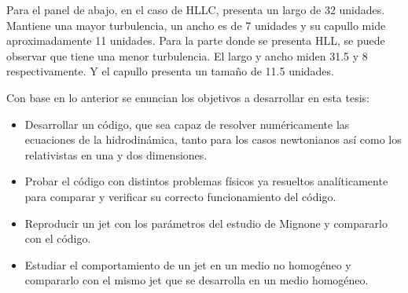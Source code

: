 \documentclass[12pt,a4paper]{book}
\begin{document}
{\color{blue} Para el panel de abajo, en el caso de HLLC, presenta un largo de 32 unidades. Mantiene una mayor turbulencia, un ancho es de 7 unidades y su capullo mide aproximadamente 11 unidades. Para la parte donde se presenta HLL, se puede observar que tiene una menor turbulencia. El largo y ancho miden 31.5 y 8 respectivamente. Y el capullo presenta un tamaño de 11.5 unidades. }

{\color{blue} Con base en lo anterior se enuncian los objetivos a desarrollar en esta tesis:
\begin{itemize}
  \item Desarrollar un código, que sea capaz de resolver numéricamente las ecuaciones de la hidrodinámica, tanto para los casos newtonianos así como los relativistas en una y dos dimensiones.
  \item Probar el código con distintos problemas físicos ya resueltos analíticamente para comparar y verificar su correcto funcionamiento del código.
  \item Reproducir un jet con los parámetros del estudio de Mignone y compararlo con el código.
  \item Estudiar el comportamiento de un jet en un medio no homogéneo y compararlo con el mismo jet que se desarrolla en un medio homogéneo.
\end{itemize}

}








\end{document}

